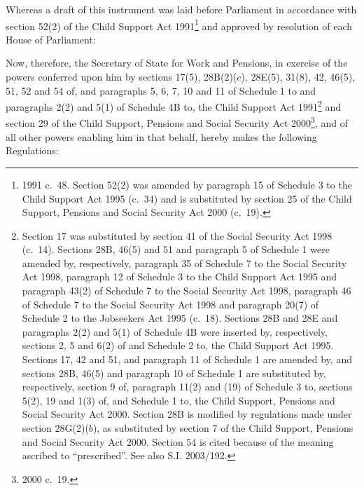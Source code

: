 \documentclass[12pt,a4paper]{article}
\title{\regstitle}
\author{S.I.\ 2003 No.\ 328}
\date{Made
20th February 2003\\
Coming into force
in accordance with regulation 1(3)
}
\begin{document}
\maketitle

\noindent
Whereas a draft of this instrument was laid before Parliament in accordance with section 52(2) of the Child Support Act 1991\footnote{1991 c.\ 48. Section 52(2) was amended by paragraph 15 of Schedule 3 to the Child Support Act 1995 (c.\ 34) and is substituted by section 25 of the Child Support, Pensions and Social Security Act 2000 (c.\ 19).} and approved by resolution of each House of Parliament:

Now, therefore, the Secretary of State for Work and Pensions, in exercise of the powers conferred upon him by sections 17(5), 28B(2)($c$), 28E(5), 31(8), 42, 46(5), 51, 52 and 54 of, and paragraphs 5, 6, 7, 10 and 11 of Schedule 1 to and paragraphs 2(2) and 5(1) of Schedule 4B to, the Child Support Act 1991\footnote{Section 17 was substituted by section 41 of the Social Security Act 1998 (c.\ 14). Sections 28B, 46(5) and 51 and paragraph 5 of Schedule 1 were amended by, respectively, paragraph 35 of Schedule 7 to the Social Security Act 1998, paragraph 12 of Schedule 3 to the Child Support Act 1995 and paragraph 43(2) of Schedule 7 to the Social Security Act 1998, paragraph 46 of Schedule 7 to the Social Security Act 1998 and paragraph 20(7) of Schedule 2 to the Jobseekers Act 1995 (c.\ 18). Sections 28B and 28E and paragraphs 2(2) and 5(1) of Schedule 4B were inserted by, respectively, sections 2, 5 and 6(2) of and Schedule 2 to, the Child Support Act 1995. Sections 17, 42 and 51, and paragraph 11 of Schedule 1 are amended by, and sections 28B, 46(5) and paragraph 10 of Schedule 1 are substituted by, respectively, section 9 of, paragraph 11(2) and (19) of Schedule 3 to, sections 5(2), 19 and 1(3) of, and Schedule 1 to, the Child Support, Pensions and Social Security Act 2000. Section 28B is modified by regulations made under section 28G(2)($b$), as substituted by section 7 of the Child Support, Pensions and Social Security Act 2000. Section 54 is cited because of the meaning ascribed to “prescribed”. See also S.I. 2003/192.} and section 29 of the Child Support, Pensions and Social Security Act 2000\footnote{2000 c.\ 19.}, and of all other powers enabling him in that behalf, hereby makes the following Regulations: 

\enlargethispage{\baselineskip}

{\sloppy

\tableofcontents

}
\end{document}
